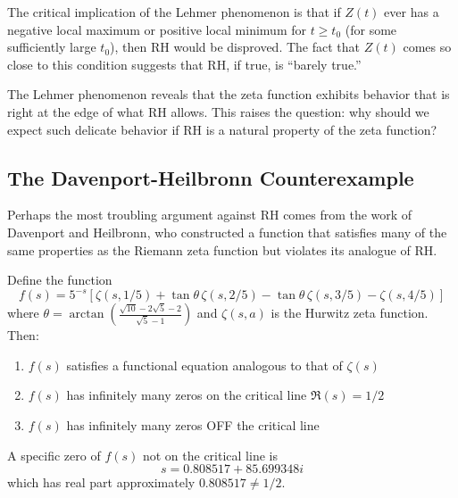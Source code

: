 \begin{remark}
The critical implication of the Lehmer phenomenon is that if $Z(t)$ ever has a negative local maximum or positive local minimum for $t \geq t_0$ (for some sufficiently large $t_0$), then RH would be disproved. The fact that $Z(t)$ comes so close to this condition suggests that RH, if true, is ``barely true.''
\end{remark}

The Lehmer phenomenon reveals that the zeta function exhibits behavior that is right at the edge of what RH allows. This raises the question: why should we expect such delicate behavior if RH is a natural property of the zeta function?

\subsection{The Davenport-Heilbronn Counterexample}
\label{subsec:davenport_heilbronn}

Perhaps the most troubling argument against RH comes from the work of Davenport and Heilbronn, who constructed a function that satisfies many of the same properties as the Riemann zeta function but violates its analogue of RH.

\begin{theorem}
Define the function
\begin{equation}
f(s) = 5^{-s}\left[\zeta(s,1/5) + \tan\theta\,\zeta(s,2/5) - \tan\theta\,\zeta(s,3/5) - \zeta(s,4/5)\right]
\end{equation}
where $\theta = \arctan\left(\frac{\sqrt{10} - 2\sqrt{5} - 2}{\sqrt{5} - 1}\right)$ and $\zeta(s,a)$ is the Hurwitz zeta function. Then:
\begin{enumerate}
\item $f(s)$ satisfies a functional equation analogous to that of $\zeta(s)$
\item $f(s)$ has infinitely many zeros on the critical line $\Re(s) = 1/2$
\item $f(s)$ has infinitely many zeros OFF the critical line
\end{enumerate}
\end{theorem}

\begin{example}
A specific zero of $f(s)$ not on the critical line is
\begin{equation}
s = 0.808517 + 85.699348i
\end{equation}
which has real part approximately $0.808517 \neq 1/2$.
\end{example}

